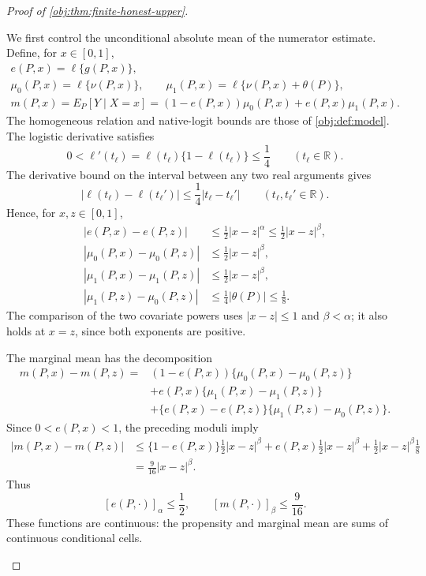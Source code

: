 \documentclass[11pt]{article}
\begin{document}
\begin{proof}[Proof of \cref{obj:thm:finite-honest-upper}]
\begin{enumerate}
We first control the unconditional absolute mean of the numerator estimate. Define, for \(x\in[0,1]\),
\[
\begin{gathered}
e(P,x)=\ell\{g(P,x)\},\\
\mu_0(P,x)=\ell\{\nu(P,x)\},
\qquad
\mu_1(P,x)=\ell\{\nu(P,x)+\theta(P)\},\\
m(P,x)=E_P[Y\mid X=x]
=(1-e(P,x))\mu_0(P,x)+e(P,x)\mu_1(P,x).
\end{gathered}
\]
The homogeneous relation and native-logit bounds are those of
\cref{obj:def:model}. The logistic derivative satisfies
\[
0<\ell'(t_{\ell})
=\ell(t_{\ell})\{1-\ell(t_{\ell})\}
\le\frac14
\qquad(t_{\ell}\in\mathbb R).
\]
The derivative bound on the interval between any two real arguments gives
\[
|\ell(t_{\ell})-\ell(t_{\ell}')|
\le\frac14|t_{\ell}-t_{\ell}'|
\qquad(t_{\ell},t_{\ell}'\in\mathbb R).
\]
Hence, for \(x,z\in[0,1]\),
\[
\begin{aligned}
|e(P,x)-e(P,z)|
&\le\frac12|x-z|^\alpha
\le\frac12|x-z|^\beta,\\
|\mu_0(P,x)-\mu_0(P,z)|
&\le\frac12|x-z|^\beta,\\
|\mu_1(P,x)-\mu_1(P,z)|
&\le\frac12|x-z|^\beta,\\
|\mu_1(P,z)-\mu_0(P,z)|
&\le\frac14|\theta(P)|\le\frac18.
\end{aligned}
\]
The comparison of the two covariate powers uses
\(|x-z|\le1\) and \(\beta<\alpha\); it also holds at \(x=z\), since both exponents are positive.

The marginal mean has the decomposition
\[
\begin{aligned}
m(P,x)-m(P,z)
={}&(1-e(P,x))\{\mu_0(P,x)-\mu_0(P,z)\}\\
&+e(P,x)\{\mu_1(P,x)-\mu_1(P,z)\}\\
&+\{e(P,x)-e(P,z)\}
  \{\mu_1(P,z)-\mu_0(P,z)\}.
\end{aligned}
\]
Since \(0<e(P,x)<1\), the preceding moduli imply
\[
\begin{aligned}
|m(P,x)-m(P,z)|
&\le
\{1-e(P,x)\}\frac12|x-z|^\beta
+e(P,x)\frac12|x-z|^\beta
+\frac12|x-z|^\beta\frac18\\
&=\frac9{16}|x-z|^\beta.
\end{aligned}
\]
Thus
\[
[e(P,\cdot)]_\alpha\le\frac12,
\qquad
[m(P,\cdot)]_\beta\le\frac9{16}.
\]
These functions are continuous: the propensity and marginal mean are sums of continuous conditional cells.


\end{enumerate}
\end{proof}
\end{document}
